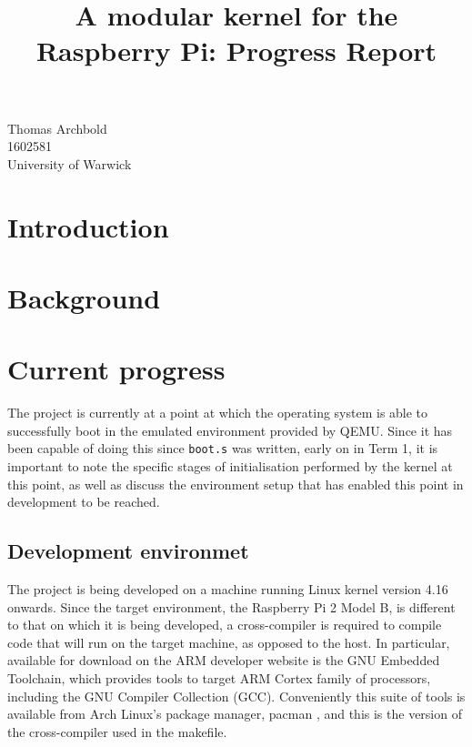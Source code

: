 \documentclass[10pt,a4paper]{article}
\title{A modular kernel for the Raspberry Pi: Progress Report}
\newcommand{\code}[1]{\texttt{#1}}
\begin{document}
\maketitle

\begin{center}
    Thomas Archbold \\
    1602581 \\
    University of Warwick \\
\end{center}

\section{Introduction}

\section{Background}

\section{Current progress}
The project is currently at a point at which the operating system is able to
successfully boot in the emulated environment provided by QEMU. Since it has
been capable of doing this since \code{boot.s} was written, early on in Term 1,
it is important to note the specific stages of initialisation performed by the
kernel at this point, as well as discuss the environment setup that has enabled
this point in development to be reached.

\subsection{Development environmet}
The project is being developed on a machine running Linux kernel version 4.16
onwards. Since the target environment, the Raspberry Pi 2 Model B, is different
to that on which it is being developed, a cross-compiler is required to compile
code that will run on the target machine, as opposed to the host. In particular,
available for download on the ARM developer website \cite{GNUtoolchain} is the
GNU Embedded Toolchain, which provides tools to target ARM Cortex family of
processors, including the GNU Compiler Collection (GCC). Conveniently this suite
of tools is available from Arch Linux's package manager, pacman \cite{pacman},
and this is the version of the cross-compiler used in the makefile.
\end{document}
